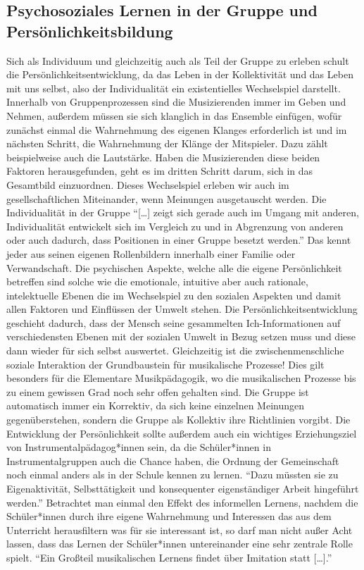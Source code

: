 \subsection{Psychosoziales Lernen in der Gruppe und Persönlichkeitsbildung}
Sich als Individuum und gleichzeitig auch als Teil der Gruppe zu erleben schult
die Persönlichkeitsentwicklung, da das Leben in der Kollektivität und
das Leben mit uns selbst, also der Individualität ein existentielles
Wechselspiel darstellt. Innerhalb von Gruppenprozessen sind die Musizierenden
immer im Geben und Nehmen, außerdem müssen sie sich klanglich in das Ensemble
einfügen, wofür zunächst einmal die Wahrnehmung des eigenen Klanges erforderlich
ist und im nächsten Schritt, die Wahrnehmung der Klänge der Mitspieler. Dazu
zählt beispielweise auch die Lautstärke. Haben die Musizierenden diese beiden
Faktoren herausgefunden, geht es im dritten Schritt darum, sich in das
Gesamtbild einzuordnen. Dieses Wechselspiel erleben wir auch im
gesellschaftlichen Miteinander, wenn Meinungen ausgetauscht werden. Die
Individualität in der Gruppe \enquote{[…] zeigt sich gerade auch im Umgang mit
anderen, Individualität entwickelt sich im Vergleich zu und in Abgrenzung von
anderen oder auch dadurch, dass Positionen in einer Gruppe besetzt
werden.}\autocite[95]{ribke:emp} Das kennt jeder aus seinen eigenen
Rollenbildern innerhalb einer Familie oder Verwandschaft. Die psychischen
Aspekte, welche alle die eigene Persönlichkeit betreffen sind solche wie die
emotionale, intuitive aber auch rationale, intelektuelle Ebenen die im
Wechselspiel zu den sozialen Aspekten und damit allen Faktoren und Einflüssen
der Umwelt stehen. Die Persönlichkeitsentwicklung geschieht dadurch, dass der
Mensch seine gesammelten Ich-Informationen auf verschiedensten Ebenen mit der
sozialen Umwelt in Bezug setzen muss und diese dann wieder für sich selbst
auswertet. Gleichzeitig ist die zwischenmenschliche soziale Interaktion der
Grundbaustein für musikalische Prozesse! Dies gilt besonders für die Elementare
Musikpädagogik, wo die musikalischen Prozesse bis zu einem gewissen Grad noch
sehr offen gehalten sind. Die Gruppe ist automatisch immer ein Korrektiv, da
sich keine einzelnen Meinungen gegenüberstehen, sondern die Gruppe als Kollektiv
ihre Richtlinien vorgibt. Die Entwicklung der Persönlichkeit sollte außerdem
auch ein wichtiges Erziehungsziel von Instrumentalpädagog*innen sein, da die
Schüler*innen in Instrumentalgruppen auch die Chance haben, die Ordnung der
Gemeinschaft noch einmal anders als in der Schule kennen zu lernen.
\enquote{Dazu müssten sie zu Eigenaktivität, Selbsttätigkeit und konsequenter
eigenständiger Arbeit hingeführt
werden.}\autocite[64]{losert:die_kunst_zu_unterrichten} Betrachtet man einmal
den Effekt des informellen Lernens, nachdem die Schüler*innen durch ihre
eigene Wahrnehmung und Interessen das aus dem Unterricht herausfiltern was für
sie interessant ist, so darf man nicht außer Acht lassen, dass das Lernen der
Schüler*innen untereinander eine sehr zentrale Rolle spielt. \enquote{Ein
Großteil musikalischen Lernens findet über Imitation statt
[…].}\autocite[98]{doerne:umfassend_musizieren}



